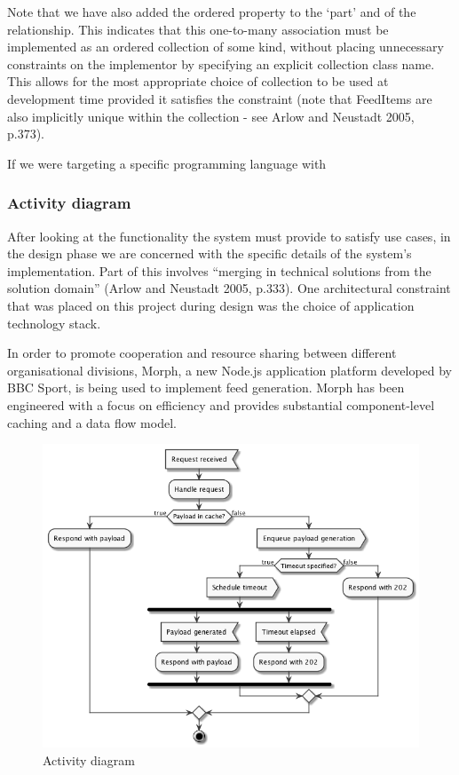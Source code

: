 \documentclass[a4paper]{article}
\begin{document}
Note that we have also added the \textsf{ordered} property to the `part' and of the relationship. This indicates that this one-to-many association must be implemented as an ordered collection of some kind, without placing unnecessary constraints on the implementor by specifying an explicit collection class name. This allows for the most appropriate choice of collection to be used at development time provided it satisfies the constraint (note that \textsf{FeedItem}s are also implicitly unique within the collection - see Arlow and Neustadt 2005, p.373).

If we were targeting a specific programming language with 

\subsubsection{Activity diagram}

After looking at the functionality the system must provide to satisfy use cases, in the design phase we are concerned with the specific details of the system's implementation. Part of this involves ``merging in technical solutions from the solution domain'' (Arlow and Neustadt 2005, p.333). One architectural constraint that was placed on this project during design was the choice of application technology stack.

In order to promote cooperation and resource sharing between different organisational divisions, Morph, a new Node.js application platform developed by BBC Sport, is being used to implement feed generation. Morph has been engineered with a focus on efficiency and provides substantial component-level caching and a data flow model.

\begin{figure}
  \begin{center}
    \includegraphics[width=\textwidth]{activity.png}
  \end{center}
  \label{activity}
  \caption{Activity diagram}
\end{figure}
\end{document}
